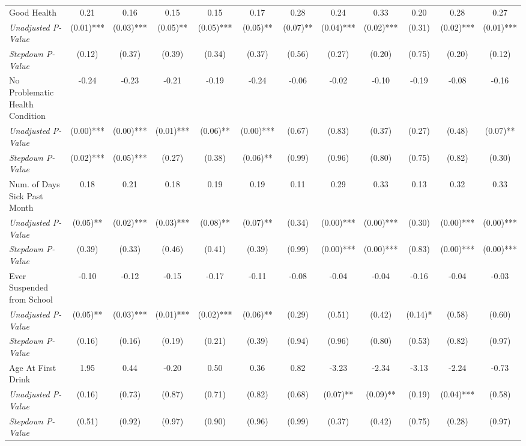 \begin{tabular}{l c c c c c c c c c c c}
Good Health & 0.21 & 0.16 & 0.15 & 0.15 & 0.17 & 0.28 & 0.24 & 0.33 & 0.20 & 0.28 & 0.27 \\
\quad \textit{Unadjusted P-Value} & (0.01)*** & (0.03)*** & (0.05)** & (0.05)*** & (0.05)** & (0.07)** & (0.04)*** & (0.02)*** & (0.31) & (0.02)*** & (0.01)*** \\
\quad \textit{Stepdown P-Value} & (0.12) & (0.37) & (0.39) & (0.34) & (0.37) & (0.56) & (0.27) & (0.20) & (0.75) & (0.20) & (0.12) \\
No Problematic Health Condition & -0.24 & -0.23 & -0.21 & -0.19 & -0.24 & -0.06 & -0.02 & -0.10 & -0.19 & -0.08 & -0.16 \\
\quad \textit{Unadjusted P-Value} & (0.00)*** & (0.00)*** & (0.01)*** & (0.06)** & (0.00)*** & (0.67) & (0.83) & (0.37) & (0.27) & (0.48) & (0.07)** \\
\quad \textit{Stepdown P-Value} & (0.02)*** & (0.05)*** & (0.27) & (0.38) & (0.06)** & (0.99) & (0.96) & (0.80) & (0.75) & (0.82) & (0.30) \\
Num. of Days Sick Past Month & 0.18 & 0.21 & 0.18 & 0.19 & 0.19 & 0.11 & 0.29 & 0.33 & 0.13 & 0.32 & 0.33 \\
\quad \textit{Unadjusted P-Value} & (0.05)** & (0.02)*** & (0.03)*** & (0.08)** & (0.07)** & (0.34) & (0.00)*** & (0.00)*** & (0.30) & (0.00)*** & (0.00)*** \\
\quad \textit{Stepdown P-Value} & (0.39) & (0.33) & (0.46) & (0.41) & (0.39) & (0.99) & (0.00)*** & (0.00)*** & (0.83) & (0.00)*** & (0.00)*** \\
Ever Suspended from School & -0.10 & -0.12 & -0.15 & -0.17 & -0.11 & -0.08 & -0.04 & -0.04 & -0.16 & -0.04 & -0.03 \\
\quad \textit{Unadjusted P-Value} & (0.05)** & (0.03)*** & (0.01)*** & (0.02)*** & (0.06)** & (0.29) & (0.51) & (0.42) & (0.14)* & (0.58) & (0.60) \\
\quad \textit{Stepdown P-Value} & (0.16) & (0.16) & (0.19) & (0.21) & (0.39) & (0.94) & (0.96) & (0.80) & (0.53) & (0.82) & (0.97) \\
Age At First Drink & 1.95 & 0.44 & -0.20 & 0.50 & 0.36 & 0.82 & -3.23 & -2.34 & -3.13 & -2.24 & -0.73 \\
\quad \textit{Unadjusted P-Value} & (0.16) & (0.73) & (0.87) & (0.71) & (0.82) & (0.68) & (0.07)** & (0.09)** & (0.19) & (0.04)*** & (0.58) \\
\quad \textit{Stepdown P-Value} & (0.51) & (0.92) & (0.97) & (0.90) & (0.96) & (0.99) & (0.37) & (0.42) & (0.75) & (0.28) & (0.97) \\
\bottomrule
\end{tabular}
